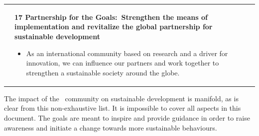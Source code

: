 \documentclass[../SustainableHEP.tex]{subfiles}
\begin{document}
\begin{longtable*}{l l}
\parbox[t]{\SDGleft\textwidth}{} & \parbox[t]{\SDGright\textwidth}{\textbf{17 Partnership for the Goals:\ Strengthen the means of implementation and revitalize the global partnership for sustainable development}
\begin{itemize}[leftmargin=20pt]
\item As an international community based on research and a driver for innovation, we can influence our partners and work together to strengthen a sustainable society around the globe.
\end{itemize}}

\end{longtable*}
\renewcommand*{\arraystretch}{1}

The impact of the \ACR\ community on sustainable development is manifold, as is clear from this non-exhaustive list. It is impossible to cover all aspects in this document. The goals are meant to inspire and provide guidance in order to raise awareness and initiate a change towards more sustainable behaviours.
\end{document}
